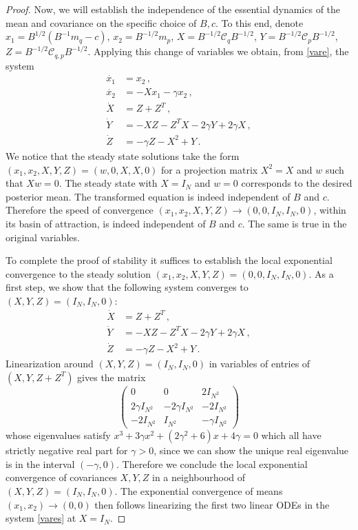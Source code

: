 \documentclass[12pt]{caltech_thesis}
\numberwithin{equation}{section}
\begin{document}
{\begin{proof}
{Now, we will establish the independence of the essential dynamics of the
mean and covariance on the specific choice of $B,c$. To this end, denote $x_1 = B^{1/2}(B^{-1}m_q-c)$, $x_2 = B^{-1/2}m_p$, $X = B^{-1/2}\mathcal{C}_qB^{-1/2}$, $Y = B^{-1/2}\mathcal{C}_pB^{-1/2}$, $Z = B^{-1/2}\mathcal{C}_{q,p}B^{-1/2}$. Applying this
change of variables we obtain, from \eqref{vare}, the system} 
\begin{equation}
\label{vares}
\begin{aligned}
\dot{x_1}&= x_2\,, \\
\dot{x_2}&=-X x_1 - {\gamma}x_2\,,\\
\dot{X}&=Z+Z^T\,,\\
\dot{Y}&=-X Z-Z^T X- 2{\gamma}Y+2{\gamma}X\,,\\
\dot{Z}&=- {\gamma}Z -X^2 +Y\,.
\end{aligned}
\end{equation}
We notice that the steady state solutions take the form $(x_1,x_2,X,Y,Z)=(w,0,X,X,0)$ for a projection matrix $X^2=X$ and  $w$ such that $Xw=0$.
{The  steady state} with $X=I_N$ and $w=0$ corresponds to the desired posterior mean.
The transformed equation is indeed independent of $B$ and $c$. Therefore the speed of convergence  $(x_1,x_2,X,Y,Z) \to (0,0,I_N,I_N,0)$, within its basin of
attraction, is indeed independent of $B$ and $c.$ The same is true in the original
variables.

{To complete the proof of stability it suffices} to establish the local exponential 
convergence to the
steady solution $(x_1,x_2,X,Y,Z)=(0,0,I_N,I_N,0)$. As a first step, we show that the following system converges to $(X,Y,Z)=(I_N,I_N,0)$:
\begin{equation}
\label{meanco}
\begin{aligned}
\dot{X}&=Z+Z^T\,,\\
\dot{Y}&=-X Z-Z^T X- 2{\gamma}Y+2{\gamma}X\,,\\
\dot{Z}&=-{\gamma}Z -X^2 +Y\,.
\end{aligned}
\end{equation}
{Linearization around $(X,Y,Z)=(I_N,I_N,0)$ {in variables of entries of $(X,Y,Z+Z^T)$} gives the matrix $$\begin{pmatrix}
0 & 0 & 2I_{N^2} \\
2\gamma I_{N^2} & -2\gamma I_{N^2} & -2I_{N^2} \\
-2I_{N^2} & I_{N^2} & -\gamma I_{N^2} 
\end{pmatrix}$$
{whose eigenvalues satisfy $x^3+3\gamma x^2+(2\gamma ^2+6)x+4\gamma=0$ which all have
strictly negative real part for $\gamma>0$, since we can show the unique real eigenvalue is in the interval $(-\gamma,0)$.} Therefore we conclude the local exponential convergence of covariances $X,Y,Z$ in a neighbourhood of $(X,Y,Z)=(I_N,I_N,0)$.
The exponential convergence of means $(x_1,x_2) \to (0,0)$ then follows 
linearizing the first two linear ODEs in the system \eqref{vares} at $X=I_N.$}


\end{proof}}
\end{document}
